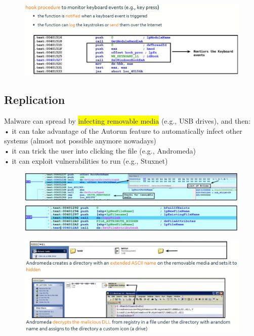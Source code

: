 \documentclass[]{project_plan}
\begin{document}
\begin{figure}[H]
  \centering
  \includegraphics[width=\linewidth]{keylogger 2.png}
\end{figure}

\subsection{Replication}
Malware can spread by \colorbox{yellow}{infecting removable media} (e.g., USB drives), and then:\\
• it can take advantage of the Autorun feature to automatically infect other systems (almost not possible anymore nowadays)\\
• it can trick the user into clicking the file (e.g., Andromeda)\\
• it can exploit vulnerabilities to run (e.g., Stuxnet)

\begin{figure}[H]
  \centering
  \includegraphics[width=\linewidth]{replication.png}
\end{figure}

\begin{figure}[H]
  \centering
  \includegraphics[width=\linewidth]{replication 2.png}
\end{figure}
\end{document}
